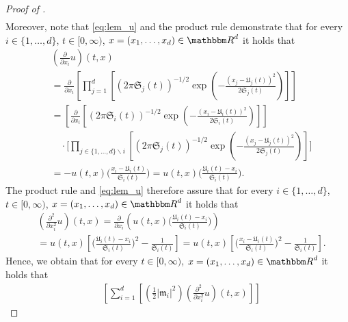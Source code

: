 \begin{proof}[Proof of ]
\begin{equation}
\begin{split}
		\end{split}
	\end{equation}
	Moreover, note that \eqref{eq:lem_u} and the product rule demonstrate that for every
	$i \in \{1, \dots,d\}$,
	$t \in [0,\infty)$,
	$x = (x_1, \dots,x_d)\in \R^d$
	it holds that 
	\begin{equation}
		\begin{split}
			&( \tfrac{\partial }{\partial x_i} u)(t,x)\\
			&=  \frac{\partial }{\partial x_i}  
			\left[\prod_{j = 1}^d\left[(2\pi   \mathfrak{S}_j(t))^{-1/2}   \exp \! \left( - \frac{(x_j -\mathfrak{U}_j(t) )^2}{2\mathfrak{S}_j(t)}\right) \right] \right]\\
			&= \left[ \frac{\partial }{\partial x_i} 
				\left[(2\pi   \mathfrak{S}_i(t))^{-1/2}   \exp \! \left( - \frac{(x_i -\mathfrak{U}_i(t) )^2}{2\mathfrak{S}_i(t)} \right) \right] \right]\\
				&\quad \cdot \Bigg[\prod_{ j \in \{ 1, \dots,d \} \backslash i} \left[ (2\pi   \mathfrak{S}_j(t))^{-1/2}   \exp \! \left( - \frac{(x_j -\mathfrak{U}_j(t) )^2}{2\mathfrak{S}_j(t)} \right) \right] \Bigg]\\
			&= - u(t,x) \bigg( \frac{x_i - \mathfrak{U}_i(t)}{\mathfrak{S}_i(t)} \bigg) = u(t,x) \bigg( \frac{\mathfrak{U}_i(t) - x_i }{\mathfrak{S}_i(t)} \bigg).
		\end{split}
	\end{equation}
	The product rule and \eqref{eq:lem_u} therefore assure that for every
	$i \in \{1, \dots,d\}$,
	$t \in [0,\infty)$,
	$x = (x_1, \dots,x_d)\in \R^d$
	it holds that 
	\begin{equation}
		\begin{split}
			&( \tfrac{\partial^2 }{\partial x_i^2} u )(t,x) = \frac{\partial }{\partial x_i} \left(u(t,x) \bigg( \frac{ \mathfrak{U}_i(t) - x_i}{\mathfrak{S}_i(t)} \bigg)\right)\\
			&= u(t,x) \left[ \bigg(\frac{\mathfrak{U}_i(t) - x_i}{\mathfrak{S}_i(t)}\bigg)^{\!2} - \frac{1}{\mathfrak{S}_i(t)} \right] = u(t,x) \left[ \bigg(\frac{x_i - \mathfrak{U}_i(t)}{\mathfrak{S}_i(t)}\bigg)^{\!2} - \frac{1}{\mathfrak{S}_i(t)} \right].
		\end{split}
	\end{equation}
	Hence, we obtain that for every
	$t \in [0,\infty)$,
	$x = (x_1, \dots,x_d)\in \R^d$
	it holds that 
	\begin{equation}\label{lem:derivatives2}
		\begin{split}
			&\left[ \sum_{i=1}^d \left[ \left( \tfrac{1}{2} |\mathfrak{m}_i|^2\right)(\tfrac{\partial^2 }{\partial x_i^2} u) (t,x) \right] \right] 

\end{split}
\end{equation}
\end{proof}
